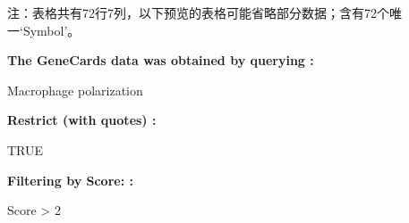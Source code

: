 \documentclass[
]{article}
\begin{document}
\begin{center}\begin{tcolorbox}[colback=gray!10, colframe=gray!50, width=0.9\linewidth, arc=1mm, boxrule=0.5pt]注：表格共有72行7列，以下预览的表格可能省略部分数据；含有72个唯一`Symbol'。
\end{tcolorbox}
\end{center}\begin{center}\begin{tcolorbox}[colback=gray!10, colframe=gray!50, width=0.9\linewidth, arc=1mm, boxrule=0.5pt]
\textbf{
The GeneCards data was obtained by querying
:}

\vspace{0.5em}

    Macrophage polarization

\vspace{2em}


\textbf{
Restrict (with quotes)
:}

\vspace{0.5em}

    TRUE

\vspace{2em}


\textbf{
Filtering by Score:
:}

\vspace{0.5em}

    Score > 2

\vspace{2em}
\end{tcolorbox}
\end{center}
\end{document}
